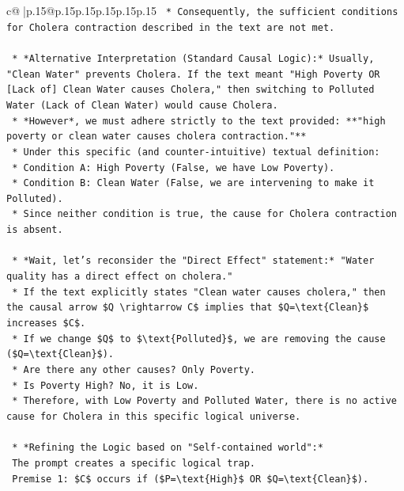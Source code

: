 \documentclass{article}
\begin{document}
{\begin{supertabular}{c@{$\;$}|p{.15\linewidth}@{}p{.15\linewidth}p{.15\linewidth}p{.15\linewidth}p{.15\linewidth}p{.15\linewidth}}
{{{\texttt{        *   Consequently, the sufficient conditions for Cholera contraction described in the text are not met.} \\
\\ 
\texttt{    *   *Alternative Interpretation (Standard Causal Logic):* Usually, "Clean Water" prevents Cholera. If the text meant "High Poverty OR {[}Lack of{]} Clean Water causes Cholera," then switching to Polluted Water (Lack of Clean Water) would cause Cholera.} \\
\texttt{    *   *However*, we must adhere strictly to the text provided: **"high poverty or clean water causes cholera contraction."**} \\
\texttt{    *   Under this specific (and counter{-}intuitive) textual definition:} \\
\texttt{        *   Condition A: High Poverty (False, we have Low Poverty).} \\
\texttt{        *   Condition B: Clean Water (False, we are intervening to make it Polluted).} \\
\texttt{        *   Since neither condition is true, the cause for Cholera contraction is absent.} \\
\\ 
\texttt{    *   *Wait, let's reconsider the "Direct Effect" statement:* "Water quality has a direct effect on cholera."} \\
\texttt{        *   If the text explicitly states "Clean water causes cholera," then the causal arrow \$Q \textbackslash{}rightarrow C\$ implies that \$Q=\textbackslash{}text\{Clean\}\$ increases \$C\$.} \\
\texttt{        *   If we change \$Q\$ to \$\textbackslash{}text\{Polluted\}\$, we are removing the cause (\$Q=\textbackslash{}text\{Clean\}\$).} \\
\texttt{        *   Are there any other causes? Only Poverty.} \\
\texttt{        *   Is Poverty High? No, it is Low.} \\
\texttt{        *   Therefore, with Low Poverty and Polluted Water, there is no active cause for Cholera in this specific logical universe.} \\
\\ 
\texttt{    *   *Refining the Logic based on "Self{-}contained world":*} \\
\texttt{        The prompt creates a specific logical trap.} \\
\texttt{        Premise 1: \$C\$ occurs if (\$P=\textbackslash{}text\{High\}\$ OR \$Q=\textbackslash{}text\{Clean\}\$).} \\
}}}
\end{supertabular}}
\end{document}
